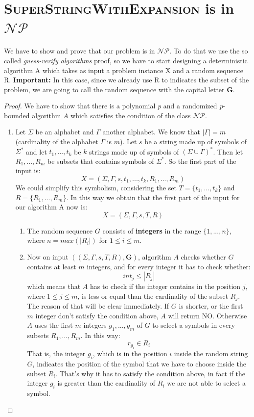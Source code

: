 \documentclass[paper=a4, fontsize=11pt]{scrartcl}
\numberwithin{equation}{section}		%
\numberwithin{figure}{section}			%
\numberwithin{table}{section}				%
\begin{document}
\section{\textsc{SuperStringWithExpansion} is in $\mathcal{NP}$}
We have to show and prove that our problem is in $\mathcal{NP}$. To do that we use the so called \textit{guess-verify algorithms} proof, so we have to start designing a deterministic algorithm A which takes as input a problem instance X and a random sequence R. \newline
\textbf{Important:} In this case, since we already use R to indicates the subset of the problem, we are going to call the random sequence with the capital letter \textbf{G}.

\begin{proof}
	We have to show that there is a polynomial \textit{p} and a randomized \textit{p}-bounded algorithm $A$ which satisfies the condition of the class $\mathcal{NP}$.  
	
	\begin{enumerate}
		\item Let $\Sigma$ be an alphabet and $\Gamma$ another alphabet. We know that $|\Gamma|=m$ (cardinality of the alphabet $\Gamma$ is $m$). Let $s$ be a string made up of symbols of $\Sigma^*$ and let $t_1,...,t_k$ be $k$ strings made up of symbols of $(\Sigma \cup \Gamma)^*$. Then let $R_1,...,R_m$ be subsets that contains symbols of $\Sigma^*$. So the first part of the input is:
		$$ X = (\Sigma,\Gamma,s,t_1,...,t_k,R_1,...,R_m) $$
		We could simplify this symbolism, considering the set $T=\{t_1,...,t_k\}$ and $R=\{R_1,...,R_m\}$. In this way we obtain that the first part of the input for our algorithm A now is:
		$$ X = (\Sigma,\Gamma,s,T,R) $$
        \begin{enumerate}
        	\item The random sequence $G$ consists of \textbf{integers} in the range $\{1,...,n\}$, where $n=max({|R_i|})$ for $1 \leq i \leq m$.
        	
        	\item Now on input $((\Sigma,\Gamma,s,T,R),\textbf{G})$, algorithm $A$ checks whether $G$ contains at least $m$ integers, and for every integer it has to check whether:
        	$$ int_j \leq |R_j| $$
        	which means that $A$ has to check if the integer contains in the position $j$, where $1 \leq j \leq m$, is less or equal than the cardinality of the subset $R_j$. The reason of that will be clear immediately. \newline
        	If $G$ is shorter, or the first $m$ integer don't satisfy the condition above, $A$ will return NO. Otherwise $A$ uses the first $m$ integers $g_1,...,g_m$ of $G$ to select a symbols in every subsets $R_1,...,R_m$. In this way:
        	$$ r_{g_i} \in R_i$$
        	That is, the integer $g_i$, which is in the position $i$ inside the random string $G$, indicates the position of the symbol that we have to choose inside the subset $R_i$. That's why it has to satisfy the condition above, in fact if the integer $g_i$ is greater than the cardinality of $R_i$ we are not able to select a symbol. 
        	

\end{enumerate}
\end{enumerate}
\end{proof}
\end{document}
